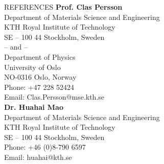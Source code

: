 \documentclass{resume} %
\begin{document}
\begin{rSection}{REFERENCES}
 {\bf Prof. Clas Persson} \\
Department of Materials Science and Engineering \\
KTH Royal Institute of Technology \\
SE – 100 44 Stockholm, Sweden \\
 -- and -- \\
Department of Physics \\
University of Oslo \\
NO-0316 Oslo, Norway \\
Phone: +47 228 52424\\
Email: Clas.Persson@mse.kth.se \\


{\bf Dr. Huahai Mao} \\
Department of Materials Science and Engineering \\
KTH Royal Institute of Technology \\
SE – 100 44 Stockholm, Sweden \\
Phone: +46 (0)8-790 6597 \\
Email: huahai@kth.se \\

 
 
\end{rSection}
\end{document}
